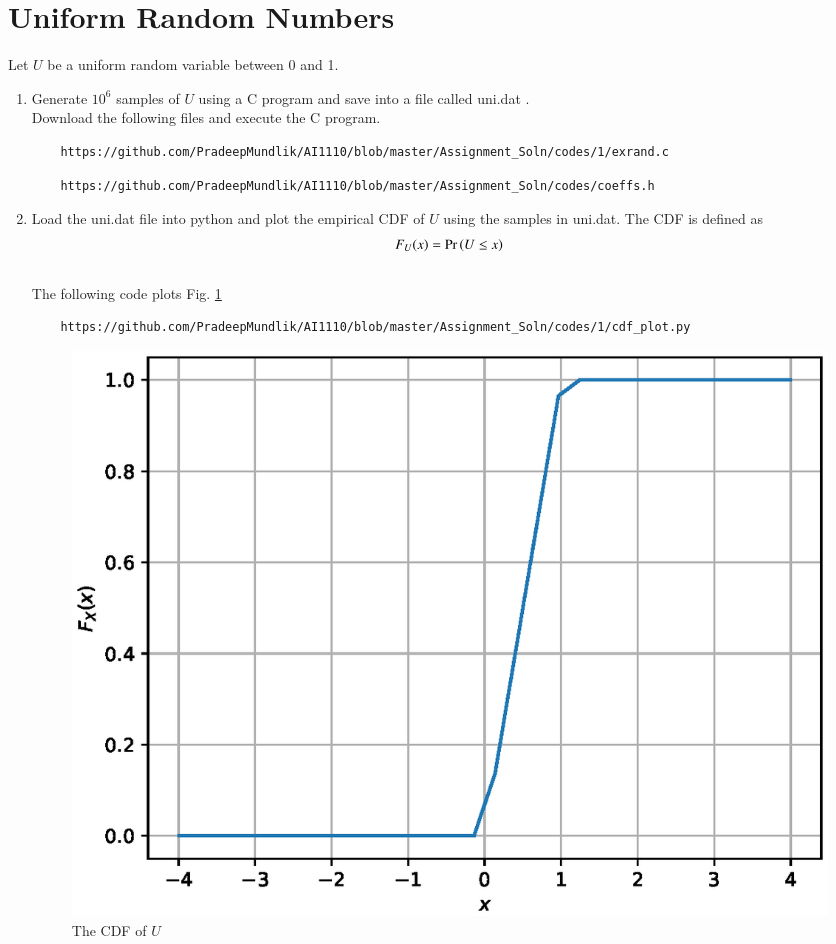 \documentclass[journal,12pt,twocolumn]{IEEEtran}
\renewcommand\thesection{\arabic{section}}
\begin{document}
\section{Uniform Random Numbers}
Let $U$ be a uniform random variable between 0 and 1.
\begin{enumerate}[label=\thesection.\arabic*
,ref=\thesection.\theenumi]
\item Generate $10^6$ samples of $U$ using a C program and save into a file called uni.dat .
\\
\solution Download the following files and execute the  C program.
\begin{lstlisting}
	https://github.com/PradeepMundlik/AI1110/blob/master/Assignment_Soln/codes/1/exrand.c 
\end{lstlisting}
\begin{lstlisting}
	https://github.com/PradeepMundlik/AI1110/blob/master/Assignment_Soln/codes/coeffs.h
\end{lstlisting}

%
\item
Load the uni.dat file into python and plot the empirical CDF of $U$ using the samples in uni.dat. The CDF is defined as
\begin{align}
F_{U}(x) = \Pr\left(U \le x\right)
\end{align}
\\
\solution  The following code plots Fig. \ref{fig:uni_cdf}
\begin{lstlisting}
	https://github.com/PradeepMundlik/AI1110/blob/master/Assignment_Soln/codes/1/cdf_plot.py
\end{lstlisting}
\begin{figure}[h]
\centering
\includegraphics[width=\columnwidth]{figs/1/uni_cdf.eps}
\caption{The CDF of $U$}
\label{fig:uni_cdf}
\end{figure}


\end{enumerate}
\end{document}
